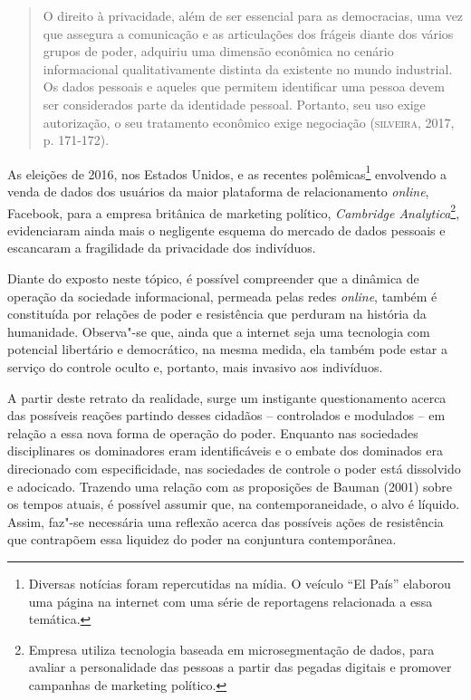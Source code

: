 \begin{quote}
O direito à privacidade, além de ser essencial para as democracias, uma
vez que assegura a comunicação e as articulações dos frágeis diante dos
vários grupos de poder, adquiriu uma dimensão econômica no cenário
informacional qualitativamente distinta da existente no mundo
industrial. Os dados pessoais e aqueles que permitem identificar uma
pessoa devem ser considerados parte da identidade pessoal. Portanto, seu
uso exige autorização, o seu tratamento econômico exige negociação (\textsc{silveira}, 2017, p. 171-172).
\end{quote}

As eleições de 2016, nos Estados Unidos, e as recentes
polêmicas\footnote{Diversas notícias foram repercutidas na mídia. O
  veículo ``El País'' elaborou uma página na internet com uma série de
  reportagens relacionada a essa temática.} envolvendo a venda de dados
dos usuários da maior plataforma de relacionamento \emph{online}, Facebook,
para a empresa britânica de marketing político, \emph{Cambridge
Analytica}\footnote{Empresa utiliza tecnologia baseada em
  microsegmentação de dados, para avaliar a personalidade das pessoas a
  partir das pegadas digitais e promover campanhas de marketing
  político.}, evidenciaram ainda mais o negligente esquema do
mercado de dados pessoais e escancaram a fragilidade da privacidade dos
indivíduos.

Diante do exposto neste tópico, é possível compreender que a dinâmica de
operação da sociedade informacional, permeada pelas redes \emph{online}, também
é constituída por relações de poder e resistência que perduram na
história da humanidade. Observa"-se que, ainda que a internet seja uma
tecnologia com potencial libertário e democrático, na mesma medida, ela
também pode estar a serviço do controle oculto e, portanto, mais
invasivo aos indivíduos.

A partir deste retrato da realidade, surge um instigante questionamento
acerca das possíveis reações partindo desses cidadãos -- controlados e
modulados -- em relação a essa nova forma de operação do poder. Enquanto
nas sociedades disciplinares os dominadores eram identificáveis e o
embate dos dominados era direcionado com especificidade, nas sociedades
de controle o poder está dissolvido e adocicado. Trazendo uma relação
com as proposições de Bauman (2001) sobre os tempos atuais, é possível
assumir que, na contemporaneidade, o alvo é líquido. Assim, faz"-se
necessária uma reflexão acerca das possíveis ações de resistência que
contrapõem essa liquidez do poder na conjuntura contemporânea.

